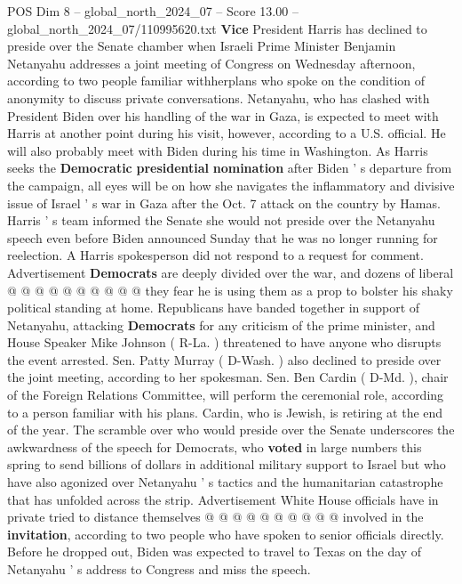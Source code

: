 \begin{textsample}{POS Dim 8 – global\_north\_2024\_07 – Score 13.00 – global\_north\_2024\_07/110995620.txt}  \label{ex:f8_pos_043}
\textbf{Vice} President Harris has declined to preside over the Senate chamber when Israeli Prime Minister Benjamin Netanyahu addresses a joint meeting of Congress on Wednesday afternoon, according to two people familiar withherplans who spoke on the condition of anonymity to discuss private conversations.
Netanyahu, who has clashed with President Biden over his handling of the war in Gaza, is expected to meet with Harris at another point during his visit, however, according to a U.S. official.
He will also probably meet with Biden during his time in Washington.
As Harris seeks the \textbf{Democratic} \textbf{presidential} \textbf{nomination} after Biden ' s departure from the campaign, all eyes will be on how she navigates the inflammatory and divisive issue of Israel ' s war in Gaza after the Oct. 7 attack on the country by Hamas.
Harris ' s team informed the Senate she would not preside over the Netanyahu speech even before Biden announced Sunday that he was no longer running for reelection.
A Harris spokesperson did not respond to a request for comment.
Advertisement \textbf{Democrats} are deeply divided over the war, and dozens of liberal @ @ @ @ @ @ @ @ @ @ they fear he is using them as a prop to bolster his shaky political standing at home.
Republicans have banded together in support of Netanyahu, attacking \textbf{Democrats} for any criticism of the prime minister, and House Speaker Mike Johnson ( R-La. ) threatened to have anyone who disrupts the event arrested.
Sen.
Patty Murray ( D-Wash. ) also declined to preside over the joint meeting, according to her spokesman.
Sen.
Ben Cardin ( D-Md. ), chair of the Foreign Relations Committee, will perform the ceremonial role, according to a person familiar with his plans.
Cardin, who is Jewish, is retiring at the end of the year.
The scramble over who would preside over the Senate underscores the awkwardness of the speech for Democrats, who \textbf{voted} in large numbers this spring to send billions of dollars in additional military support to Israel but who have also agonized over Netanyahu ' s tactics and the humanitarian catastrophe that has unfolded across the strip.
Advertisement White House officials have in private tried to distance themselves @ @ @ @ @ @ @ @ @ @ involved in the \textbf{invitation}, according to two people who have spoken to senior officials directly.
Before he dropped out, Biden was expected to travel to Texas on the day of Netanyahu ' s address to Congress and miss the speech.

\end{textsample}
